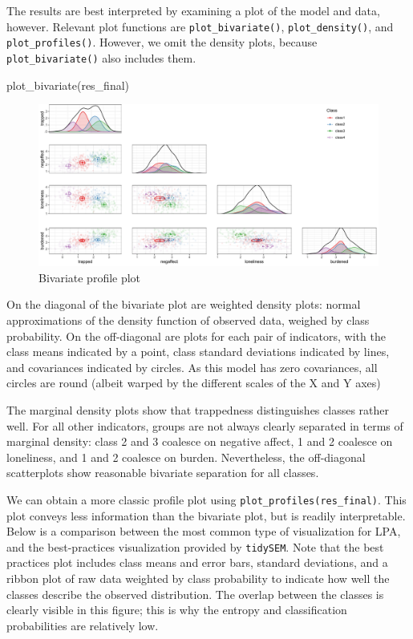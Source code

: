 \documentclass[
  man,floatsintext]{apa6}
\newenvironment{Shaded}{\begin{snugshade}}{\end{snugshade}}
\newcommand{\FunctionTok}[1]{\textcolor[rgb]{0.00,0.00,0.00}{#1}}
\newcommand{\NormalTok}[1]{#1}
\begin{document}
The results are best interpreted by examining a plot of the model and data, however.
Relevant plot functions are \texttt{plot\_bivariate()}, \texttt{plot\_density()}, and \texttt{plot\_profiles()}.
However, we omit the density plots, because \texttt{plot\_bivariate()} also includes them.

\begin{Shaded}
\begin{Highlighting}[]
\FunctionTok{plot\_bivariate}\NormalTok{(res\_final)}
\end{Highlighting}
\end{Shaded}

\begin{figure}
\includegraphics[width=1\linewidth]{appendices/lpa_bivariate} \caption{Bivariate profile plot}\label{fig:unnamed-chunk-16}
\end{figure}

On the diagonal of the bivariate plot are weighted density plots:
normal approximations of the density function of observed data,
weighed by class probability.
On the off-diagonal are plots for each pair of indicators,
with the class means indicated by a point,
class standard deviations indicated by lines,
and covariances indicated by circles.
As this model has zero covariances,
all circles are round (albeit warped by the different scales of the X and Y axes)

The marginal density plots show that trappedness distinguishes classes rather well.
For all other indicators, groups are not always clearly separated in terms of marginal density: class 2 and 3 coalesce on negative affect, 1 and 2 coalesce on loneliness, and 1 and 2 coalesce on burden.
Nevertheless, the off-diagonal scatterplots show reasonable bivariate separation for all classes.

We can obtain a more classic profile plot using \texttt{plot\_profiles(res\_final)}.
This plot conveys less information than the bivariate plot,
but is readily interpretable.
Below is a comparison between the most common type of visualization
for LPA, and the best-practices visualization provided by \texttt{tidySEM}.
Note that the best practices plot includes class means and error bars,
standard deviations,
and a ribbon plot of raw data weighted by class probability to indicate how well the classes describe the observed distribution.
The overlap between the classes is clearly visible in this figure;
this is why the entropy and classification probabilities are relatively low.
\end{document}

